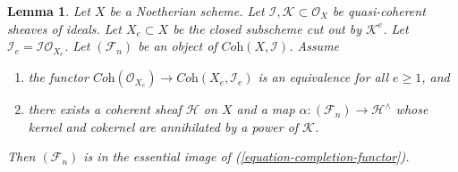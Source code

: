 \documentclass[10pt,a4paper]{amsart}
\theoremstyle{plain}
\newtheorem{lemma}[subsection]{Lemma}
\theoremstyle{definition}
\theoremstyle{remark}
\numberwithin{equation}{subsection}
\begin{document}
\begin{lemma}
\label{lemma-existence-tricky}
Let $X$ be a Noetherian scheme. Let
$\mathcal{I}, \mathcal{K} \subset \mathcal{O}_X$
be quasi-coherent sheaves of ideals.
Let $X_e \subset X$ be the closed subscheme cut out by $\mathcal{K}^e$.
Let $\mathcal{I}_e = \mathcal{I}\mathcal{O}_{X_e}$.
Let $(\mathcal{F}_n)$ be an object of $\textit{Coh}(X, \mathcal{I})$.
Assume
\begin{enumerate}
\item the functor
$\textit{Coh}(\mathcal{O}_{X_e}) \to \textit{Coh}(X_e, \mathcal{I}_e)$
is an equivalence for all $e \geq 1$, and
\item there exists a coherent sheaf $\mathcal{H}$ on $X$ and a map
$\alpha : (\mathcal{F}_n) \to \mathcal{H}^\wedge$ whose
kernel and cokernel are annihilated by a power of $\mathcal{K}$.
\end{enumerate}
Then $(\mathcal{F}_n)$ is in the essential image of
(\ref{equation-completion-functor}).
\end{lemma}
\end{document}
